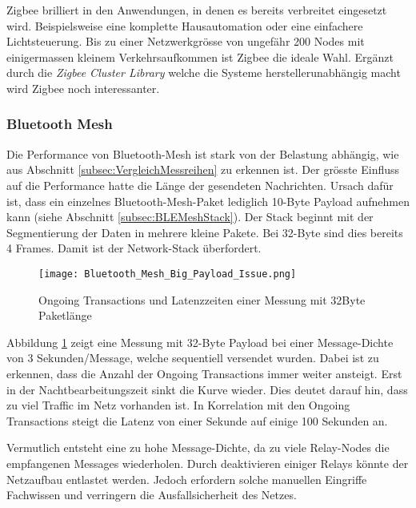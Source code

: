 Zigbee brilliert in den Anwendungen, in denen es bereits verbreitet eingesetzt wird.
Beispielsweise eine komplette Hausautomation oder eine einfachere Lichtsteuerung.
Bis zu einer Netzwerkgrösse von ungefähr 200 Nodes mit einigermassen kleinem Verkehrsaufkommen ist Zigbee die ideale Wahl.
Ergänzt durch die \textit{Zigbee Cluster Library} welche die Systeme herstellerunabhängig macht wird Zigbee noch interessanter.


\subsubsection{Bluetooth Mesh}\label{subsubsec:FazitBluetoothMesh}
Die Performance von Bluetooth-Mesh ist stark von der Belastung abhängig, wie aus Abschnitt \ref{subsec:VergleichMessreihen} zu erkennen ist.
Der grösste Einfluss auf die Performance hatte die Länge der gesendeten Nachrichten.
Ursach dafür ist, dass ein einzelnes Bluetooth-Mesh-Paket lediglich 10-Byte Payload aufnehmen kann (siehe Abschnitt \ref{subsec:BLEMeshStack}). Der Stack beginnt mit der Segmentierung der Daten in mehrere kleine Pakete. Bei 32-Byte sind dies bereits 4 Frames. Damit ist der Network-Stack überfordert. 

\begin{figure}[H]
	\centering
	\texttt{[image: Bluetooth\_Mesh\_Big\_Payload\_Issue.png]}
	\caption{Ongoing Transactions und Latenzzeiten einer Messung mit 32Byte Paketlänge}\label{fig:Bluetooth_Mesh_Big_Payload_Issue}
\end{figure}

Abbildung \ref{fig:Bluetooth_Mesh_Big_Payload_Issue} zeigt eine Messung mit 32-Byte Payload bei einer Message-Dichte von 3 Sekunden/Message, welche sequentiell versendet wurden.
Dabei ist zu erkennen, dass die Anzahl der Ongoing Transactions immer weiter ansteigt.
Erst in der Nachtbearbeitungszeit sinkt die Kurve wieder.
Dies deutet darauf hin, dass zu viel Traffic im Netz vorhanden ist. In Korrelation mit den Ongoing Transactions steigt die Latenz von einer Sekunde auf einige 100 Sekunden an.

Vermutlich entsteht eine zu hohe Message-Dichte, da zu viele Relay-Nodes die empfangenen Messages wiederholen. Durch deaktivieren einiger Relays könnte der Netzaufbau entlastet werden. Jedoch erfordern solche manuellen Eingriffe Fachwissen und verringern die Ausfallsicherheit des Netzes. 







